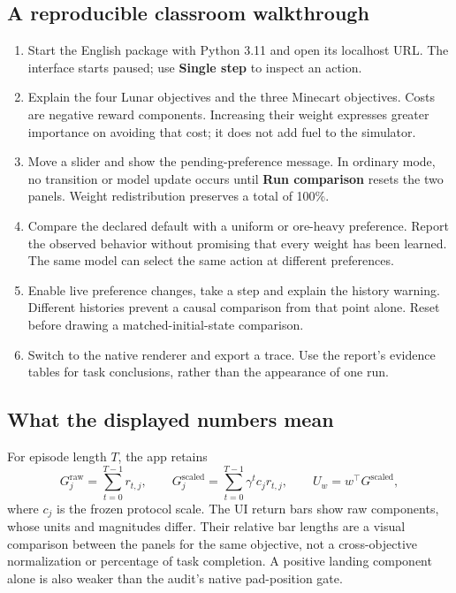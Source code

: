 \subsection{A reproducible classroom walkthrough}
\begin{enumerate}
\item Start the English package with Python 3.11 and open its localhost URL.
The interface starts paused; use \textbf{Single step} to inspect an action.
\item Explain the four Lunar objectives and the three Minecart objectives.
Costs are negative reward components. Increasing their weight expresses greater
importance on avoiding that cost; it does not add fuel to the simulator.
\item Move a slider and show the pending-preference message. In ordinary mode,
no transition or model update occurs until \textbf{Run comparison} resets the
two panels. Weight redistribution preserves a total of 100\%.
\item Compare the declared default with a uniform or ore-heavy preference.
Report the observed behavior without promising that every weight has been learned.
The same model can select the same action at different preferences.
\item Enable live preference changes, take a step and explain the history
warning. Different histories prevent a causal comparison from that point alone.
Reset before drawing a matched-initial-state comparison.
\item Switch to the native renderer and export a trace. Use the report's
evidence tables for task conclusions, rather than the appearance of one run.
\end{enumerate}

\subsection{What the displayed numbers mean}
For episode length $T$, the app retains
\[
G^{\mathrm{raw}}_j=\sum_{t=0}^{T-1}r_{t,j},\qquad
G^{\mathrm{scaled}}_j=\sum_{t=0}^{T-1}\gamma^t c_jr_{t,j},\qquad
U_w=w^\top G^{\mathrm{scaled}},
\]
where $c_j$ is the frozen protocol scale. The UI return bars show raw components,
whose units and magnitudes differ. Their relative bar lengths are a visual
comparison between the panels for the same objective, not a cross-objective
normalization or percentage of task completion. A positive landing component
alone is also weaker than the audit's native pad-position gate.

